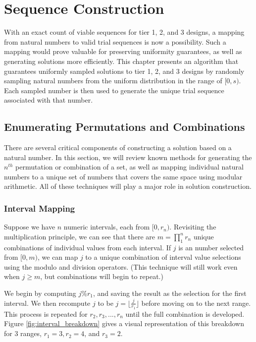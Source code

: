
\chapter{Sequence Construction}

With an exact count of viable sequences for tier 1, 2, and 3 designs, a mapping from natural numbers to valid trial sequences is now a possibility. Such a mapping would prove valuable for preserving uniformity guarantees, as well as generating solutions more efficiently. This chapter presents an algorithm that guarantees uniformly sampled solutions to tier 1, 2, and 3 designs by randomly sampling natural numbers from the uniform distribution in the range of $[0, s)$. Each sampled number is then used to generate the unique trial sequence associated with that number.


\section{Enumerating Permutations and Combinations}

There are several critical components of constructing a solution based on a natural number. In this section, we will review known methods for generating the $n^{th}$ permutation or combination of a set, as well as mapping individual natural numbers to a unique set of numbers that covers the same space using modular arithmetic. All of these techniques will play a major role in solution construction.

\subsection{Interval Mapping}

Suppose we have $n$ numeric intervals, each from $[0, r_n)$. Revisiting the multiplication principle, we can see that there are $m = \prod_1^n r_n$ unique combinations of individual values from each interval. If $j$ is an number selected from $[0, m)$, we can map $j$ to a unique combination of interval value selections using the modulo and division operators. (This technique will still work even when $j \geq m$, but combinations will begin to repeat.)

We begin by computing $j \% r_1$, and saving the result as the selection for the first interval. We then recompute $j$ to be $j = \lfloor \frac{j}{r_1} \rfloor$ before moving on to the next range. This process is repeated for $r_2,r_3,...,r_n$ until the full combination is developed. Figure \ref{fig:interval_breakdown} gives a visual representation of this breakdown for 3 ranges, $r_1 = 3, r_2 = 4$, and $r_3 = 2$.

